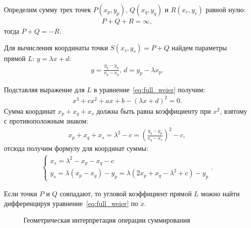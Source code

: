 \documentclass[a4paper, 14pt]{extreport}
\begin{document}
Определим сумму трех точек $P(x_p, y_p)$, $Q(x_q, y_q)$ и $R(x_r, y_r)$ равной
нулю:
\begin{gather}
    P+Q+R=\infty,
\end{gather}
тогда $P+Q=-R$.

Для вычисления координаты точки $S(x_s, y_s) = P + Q$ найдем параметры прямой
$L$: $y=\lambda x + d$:
\begin{gather}
    y = \frac{y_q - y_p}{x_q - x_p},\,d=y_p - \lambda x_p.
\end{gather}

Подставляя выражение для $L$ в уравнение~\ref{eq:full_weier} получим:
\begin{gather}
    x^3 + cx^2 + ax + b - {(\lambda x + d)}^2 = 0.
\end{gather}
Сумма координат $x_p + x_q + x_s$ должна быть равна коэффициенту при $x^2$,
взятому с противоположным знаком:
\begin{gather}
    x_p + x_q + x_s = \lambda^2 - c = {\left(\frac{y_q - y_p}{x_q -
    x_r}\right)}^2 - c,
\end{gather}
отсюда получим формулу для координат суммы:
\begin{gather}
    \begin{cases}
        x_s = \lambda^2-x_p-x_q-c\\
        y_s = \lambda(x_p-x_q) - y_p = \lambda(2x_p+x_q-\lambda^2+c) - y_p
    \end{cases}.
\end{gather}

Если точки $P$ и $Q$ совпадают, то угловой коэффициент прямой $L$ можно найти
дифференцируя уравнение~\ref{eq:full_weier} по $x$.

\begin{figure}
\centering
{}
\caption{Геометрическая интерпретация операции суммирования}
\end{figure}
\end{document}
